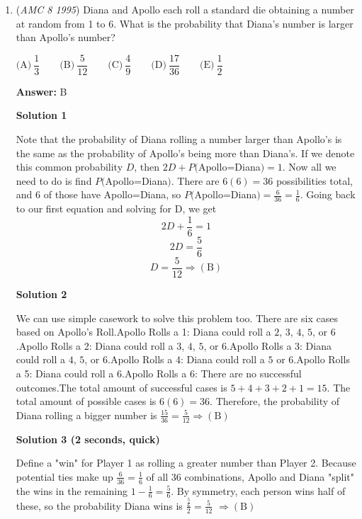 \begin{enumerate}
 \textbf{Answer: }D



\textbf{Solution}

Counting, there are thirteen total families. The middle number is 7th in either direction, and it is easy to see from the right side that this number is 4 $\text{(D)}$



	\item (\textit{AMC 8 1995}) Diana and Apollo each roll a standard die obtaining a number at random from 1 to 6.  What is the probability that Diana's number is larger than Apollo's number?


 $\text{(A)}\ \dfrac{1}{3} \qquad \text{(B)}\ \dfrac{5}{12} \qquad \text{(C)}\ \dfrac{4}{9} \qquad \text{(D)}\ \dfrac{17}{36} \qquad \text{(E)}\ \dfrac{1}{2}$

 \textbf{Answer: }B



\textbf{Solution 1}

Note that the probability of Diana rolling a number larger than Apollo's is the same as the probability of Apollo's being more than Diana's. If we denote this common probability $D$, then $2D+P($Apollo=Diana$)=1$. Now all we need to do is find $P($Apollo=Diana$)$. There are $6(6)=36$ possibilities total, and 6 of those have Apollo=Diana, so $P($Apollo=Diana$)=\frac{6}{36}=\frac{1}{6}$. Going back to our first equation and solving for D, we get 
 \[2D+\frac{1}{6}=1\] 
 \[2D=\frac{5}{6}\] 
 \[D=\frac{5}{12} \Rightarrow \mathrm{(B)}\]




\textbf{Solution 2}

We can use simple casework to solve this problem too. There are six cases based on Apollo's Roll.Apollo Rolls a 1: Diana could roll a $2$, $3$, $4$, $5$, or $6$.Apollo Rolls a 2: Diana could roll a $3$, $4$, $5$, or $6$.Apollo Rolls a 3: Diana could roll a $4$, $5$, or $6$.Apollo Rolls a 4: Diana could roll a $5$ or $6$.Apollo Rolls a 5: Diana could roll a $6$.Apollo Rolls a 6: There are no successful outcomes.The total amount of successful cases is $5+4+3+2+1 = 15$. The total amount of possible cases is $6(6) = 36$. Therefore, the probability of Diana rolling a bigger number is $\frac{15}{36} = \frac{5}{12} \Rightarrow \mathrm{(B)}$




\textbf{Solution 3 (2 seconds, quick)}

Define a "win" for Player 1 as rolling a greater number than Player 2. Because potential ties make up $\frac{6}{36}=\frac{1}{6}$ of all $36$ combinations, Apollo and Diana "split" the wins in the remaining $1-\frac{1}{6}=\frac{5}{6}$. By symmetry, each person wins half of these, so the probability Diana wins is $\frac{\frac{5}{6}}{2}=\frac{5}{12}$ $\Rightarrow \mathrm{(B)}$




\end{enumerate}
